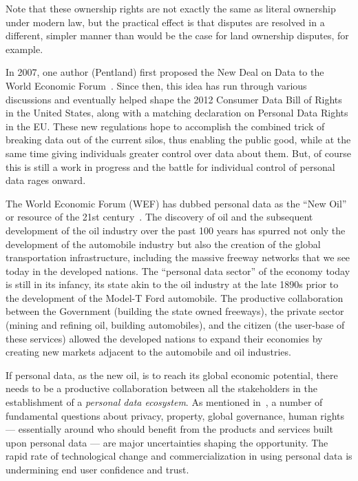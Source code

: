 Note that these ownership rights are not exactly the same as literal ownership under modern law, but the practical effect is that disputes are resolved in a different, simpler manner than would be the case for land ownership disputes, for example.

In 2007, one author (Pentland) first proposed the New Deal on Data to the World Economic Forum~\cite{WEF2011}. 
Since then, this idea has run through various discussions and eventually helped shape the 2012 Consumer Data Bill of Rights in the United States, along with a matching declaration on Personal Data Rights in the EU.
These new regulations hope to accomplish the combined trick of breaking data out of the current silos, thus enabling the public good, while at the same time giving individuals greater control over data about them.
But, of course this is still a work in progress and the battle for individual control of personal data rages onward.


The World Economic Forum (WEF) has dubbed personal data as the ``New Oil'' or resource of the 21st century~\cite{WEF2011}.
The discovery of oil and the subsequent development of the oil industry over the past 100 years has spurred not only the development of the automobile industry but also the creation of the global transportation infrastructure, including the massive freeway networks that we see today in the developed nations.
The ``personal data sector'' of the economy today is still in its infancy, its state akin to the oil industry at the late 1890s prior to the development of the Model-T Ford automobile.
The productive collaboration between the Government (building the state owned freeways), the private sector (mining and refining oil, building automobiles), and the citizen (the user-base of these services) allowed the developed nations to expand their economies by creating new markets adjacent to the automobile and oil industries.

If personal data, as the new oil, is to reach  its global economic potential, there needs to be a productive collaboration between all the stakeholders in the establishment of a {\em personal data ecosystem}.
As mentioned in~\cite{WEF2011}, a number of fundamental questions about privacy, property, 
global governance, human rights --- essentially around who should benefit from the products and services built upon personal data --- are major uncertainties shaping the opportunity.
The rapid rate of technological change and commercialization in using personal data is undermining end user confidence and trust.

